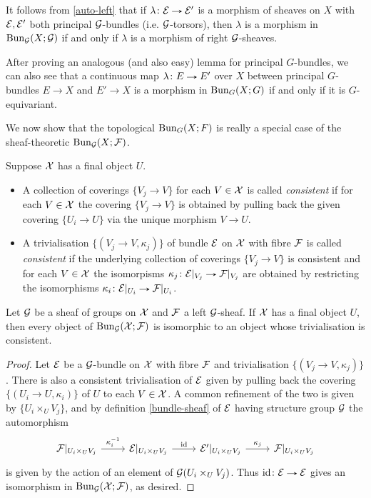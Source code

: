 \begin{remark}
  It follows from \cref{auto-left} that if $\lambda \c \E \to \E'$ is
  a morphism of sheaves on $X$ with $\mathcal{E},\mathcal{E}'$ both principal
  $\mathcal{G}$-bundles (i.e. $\mathcal{G}$-torsors), then $\lambda$ is a morphism in
  $\operatorname{Bun}_{\mathcal{G}}(X;\mathcal{G})$ if and only if $\lambda$ is a morphism of right
  $\mathcal{G}$-sheaves.

  After proving an analogous (and also easy) lemma for principal
  $G$-bundles, we can also see that a continuous map $\lambda \c E \to
  E'$ over $X$ between principal $G$-bundles $E \to X$ and $E' \to X$
  is a morphism in $\operatorname{Bun}_G(X;G)$ if and only if it is $G$-equivariant.
\end{remark}

We now show that the topological $\operatorname{Bun}_G(X;F)$ is really a special
case of the sheaf-theoretic $\operatorname{Bun}_{\mathcal{G}}(X;\mathcal{F})$.

\begin{definition}
  Suppose $\mathcal{X}$ has a final object $U$.
  \begin{itemize}
  \item A collection of coverings $\{V_j \to V\}$ for each $V \in \mathcal{X}$
    is called \emph{consistent} if for each $V \in \mathcal{X}$ the covering
    $\{V_j \to V\}$ is obtained by pulling back the given covering
    $\{U_i \to U\}$ via the unique morphism $V \to U$.
  \item A trivialisation $\{(V_j \to V,\kappa_j)\}$ of bundle $\mathcal{E}$ on
    $\mathcal{X}$ with fibre $\mathcal{F}$ is called \emph{consistent} if the underlying
    collection of coverings $\{V_j \to V\}$ is consistent and for each
    $V \in \mathcal{X}$ the isomorpisms $\kappa_j \c \E|_{V_j} \to \F|_{V_j}$
    are obtained by restricting the isomorphisms $\kappa_i \c
    \E|_{U_i} \to \F|_{U_i}$.
  \end{itemize}

\end{definition}

\begin{lemma}
  \label{iso-consistent}
  Let $\mathcal{G}$ be a sheaf of groups on $\mathcal{X}$ and $\mathcal{F}$ a left $\mathcal{G}$-sheaf. If
  $\mathcal{X}$ has a final object $U$, then every object of $\operatorname{Bun}_{\mathcal{G}}(\mathcal{X};\mathcal{F})$
  is isomorphic to an object whose trivialisation is consistent.
\end{lemma}

\begin{proof}
  Let $\mathcal{E}$ be a $\mathcal{G}$-bundle on $\mathcal{X}$ with fibre $\mathcal{F}$ and trivialisation
  $\{(V_j \to V,\kappa_j)\}$. There is also a consistent
  trivialisation of $\mathcal{E}$ given by pulling back the covering $\{(U_i
  \to U, \kappa_i)\}$ of $U$ to each $V \in \mathcal{X}$. A common refinement
  of the two is given by $\{U_i \times_U V_j\}$, and by definition
  \cref{bundle-sheaf} of $\mathcal{E}$ having structure group $\mathcal{G}$ the
  automorphism
  \[
  \begin{tikzcd}
    \F|_{U_i \times_U V_j} \ar{r}{\kappa_i^{-1}} &
    \E|_{U_i \times_U V_j} \ar{r}{\id} &
    \E'|_{U_i \times_U V_j} \ar{r}{\kappa_{j}} &
    \F|_{U_i \times_U V_j}
  \end{tikzcd}
  \]
  is given by the action of an element of $\mathcal{G}(U_i \times_U V_j)$. Thus
  $\id \c \E \to \E$ gives an isomorphism in $\operatorname{Bun}_{\mathcal{G}}(\mathcal{X};\mathcal{F})$, as
  desired.
\end{proof}

